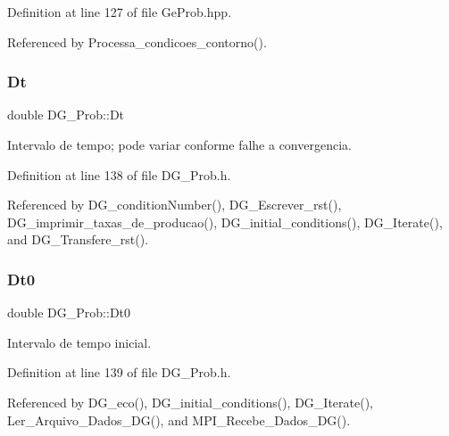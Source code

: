 Definition at line 127 of file Ge\+Prob.\+hpp.



Referenced by Processa\+\_\+condicoes\+\_\+contorno().

\mbox{\label{classDG__Prob_ad4de8afc3624f6559222e8f1f10fce6f}} 
\subsubsection{\texorpdfstring{Dt}{Dt}}
{\footnotesize\ttfamily double D\+G\+\_\+\+Prob\+::\+Dt\hspace{0.3cm}{\ttfamily [private]}}



Intervalo de tempo; pode variar conforme falhe a convergencia. 



Definition at line 138 of file D\+G\+\_\+\+Prob.\+h.



Referenced by D\+G\+\_\+condition\+Number(), D\+G\+\_\+\+Escrever\+\_\+rst(), D\+G\+\_\+imprimir\+\_\+taxas\+\_\+de\+\_\+producao(), D\+G\+\_\+initial\+\_\+conditions(), D\+G\+\_\+\+Iterate(), and D\+G\+\_\+\+Transfere\+\_\+rst().

\mbox{\label{classDG__Prob_a731fcad311bbf188572e164ca2506b66}} 
\subsubsection{\texorpdfstring{Dt0}{Dt0}}
{\footnotesize\ttfamily double D\+G\+\_\+\+Prob\+::\+Dt0\hspace{0.3cm}{\ttfamily [private]}}



Intervalo de tempo inicial. 



Definition at line 139 of file D\+G\+\_\+\+Prob.\+h.



Referenced by D\+G\+\_\+eco(), D\+G\+\_\+initial\+\_\+conditions(), D\+G\+\_\+\+Iterate(), Ler\+\_\+\+Arquivo\+\_\+\+Dados\+\_\+\+D\+G(), and M\+P\+I\+\_\+\+Recebe\+\_\+\+Dados\+\_\+\+D\+G().

\mbox{\label{classGeProb_ac32127758c84295eb361466cf37afcac}} 
